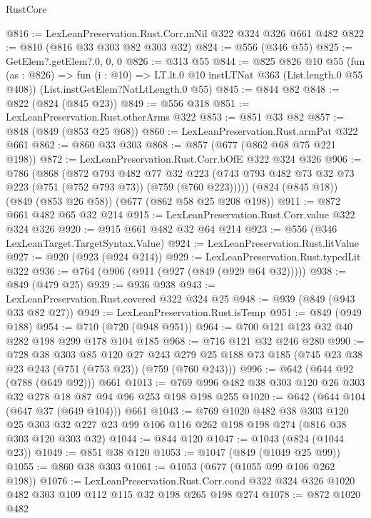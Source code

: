 \begin{lexlean}{RustCore}
\begin{coremodule}
{\begin{coremodule}
{{{{{@816 := LexLeanPreservation.Rust.Corr.mNil @322 @324 @326 @661 @482
@822 := @810 (@816 @33 @303 @82 @303 @32)
@824 := @556 (@346 @55)
@825 := GetElem?.getElem?.{0, 0, 0}
@826 := @313 @55
@844 := @825
    @826
    @10
    @55
    (fun (as : @826) => fun (i : @10) => LT.lt.{0} @10 instLTNat @363 (List.length.{0} @55 @408))
    (List.instGetElem?NatLtLength.{0} @55)
@845 := @844 @82
@848 := @822 (@824 (@845 @23))
@849 := @556 @318
@851 := LexLeanPreservation.Rust.otherArms @322
@853 := @851 @33 @82
@857 := @848 (@849 (@853 @25 @68))
@860 := LexLeanPreservation.Rust.armPat @322 @661
@862 := @860 @33 @303
@868 := @857 (@677 (@862 @68 @75 @221 @198))
@872 := LexLeanPreservation.Rust.Corr.bOfE @322 @324 @326
@906 := @786
    (@868
      (@872
        @793
        @482
        @77
        @32
        @223
        (@743 @793 @482 @73 @32 @73 @223 (@751 (@752 @793 @73)) (@759 (@760 @223)))))
    (@824 (@845 @18))
    (@849 (@853 @26 @58))
    (@677 (@862 @58 @25 @208 @198))
@911 := @872 @661 @482 @65 @32 @214
@915 := LexLeanPreservation.Rust.Corr.value @322 @324 @326
@920 := @915 @661 @482 @32 @64 @214
@923 := @556 (@346 LexLeanTarget.TargetSyntax.Value)
@924 := LexLeanPreservation.Rust.litValue
@927 := @920 (@923 (@924 @214))
@929 := LexLeanPreservation.Rust.typedLit @322
@936 := @764 (@906 (@911 (@927 (@849 (@929 @64 @32)))))
@938 := @849 (@479 @25)
@939 := @936 @938
@943 := LexLeanPreservation.Rust.covered @322 @324 @25
@948 := @939 (@849 (@943 @33 @82 @27))
@949 := LexLeanPreservation.Rust.isTemp
@951 := @849 (@949 @188)
@954 := @710 (@720 (@948 @951))
@964 := @700 @121 @123 @32 @40 @282 @198 @299 @178 @104 @185
@968 := @716 @121 @32 @246 @280
@990 := @728
    @38
    @303
    @85
    @120
    @27
    @243
    @279
    @25
    @188
    @73
    @185
    (@745 @23 @38 @23 @243 (@751 (@753 @23)) (@759 (@760 @243)))
@996 := @642 (@644 @92 (@788 (@649 @92))) @661
@1013 := @769 @996 @482 @38 @303 @120 @26 @303 @32 @278 @18 @87 @94 @96 @253 @198 @198 @255
@1020 := @642 (@644 @104 (@647 @37 (@649 @104))) @661
@1043 := @769
    @1020
    @482
    @38
    @303
    @120
    @25
    @303
    @32
    @227
    @23
    @99
    @106
    @116
    @262
    @198
    @198
    @274
    (@816 @38 @303 @120 @303 @32)
@1044 := @844 @120
@1047 := @1043 (@824 (@1044 @23))
@1049 := @851 @38 @120
@1053 := @1047 (@849 (@1049 @25 @99))
@1055 := @860 @38 @303
@1061 := @1053 (@677 (@1055 @99 @106 @262 @198))
@1076 := LexLeanPreservation.Rust.Corr.cond
    @322
    @324
    @326
    @1020
    @482
    @303
    @109
    @112
    @115
    @32
    @198
    @265
    @198
    @274
@1078 := @872 @1020 @482
}}}}}
\end{coremodule}}
\end{coremodule}
\end{lexlean}
